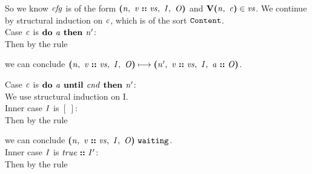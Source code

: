 \documentclass[12pt]{article}
\begin{document}
So we know $\nterm{cfg}$ is of the form
$\cfg{\nterm{n}}{\cons{\nterm{v}}{\nterm{vs}}}{\nterm{I}}{\nterm{O}}$ and
$\ver{\nterm{n}}{\nterm{c}} \in \nterm{vs}$. We continue by structural
induction on $\nterm{c}$, which is of the sort $\sort{Content}$.\\

Case $\nterm{c}$ is $\doonce{\nterm{a}}{\nterm{n'}}$:\\

Then by the rule

\begin{mathpar}
\end{mathpar}

we can conclude
$\steps{
   \cfg{\nterm{n}}{\cons{\nterm{v}}{\nterm{vs}}}{\nterm{I}}{\nterm{O}}
 }{
   \cfg{\nterm{n'}}{\cons{\nterm{v}}{\nterm{vs}}}{\nterm{I}}{\cons{\nterm{a}}{\nterm{O}}}
 }$.

Case $\nterm{c}$ is $\dountil{\nterm{a}}{\nterm{cnd}}{\nterm{n'}}$:\\

We use structural induction on I.\\

Inner case $\nterm{I}$ is $[\ ]$:\\

Then by the rule

\begin{mathpar}
\end{mathpar}

we can conclude
$\waiting{\cfg{\nterm{n}}{\cons{\nterm{v}}{\nterm{vs}}}{\nterm{I}}{\nterm{O}}}$.\\

Inner case $\nterm{I}$ is $\cons{\nterm{true}}{\nterm{I'}}$:\\

Then by the rule

\begin{mathpar}
\end{mathpar}
\end{document}
